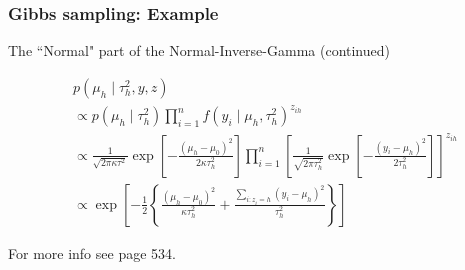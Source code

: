 \documentclass{beamer}
\begin{document}
\begin{frame}[fragile]
\frametitle{Gibbs sampling: Example}

The ``Normal" part of the Normal-Inverse-Gamma (continued)

\begin{align*}
&p(\mu_h \mid \tau^2_h, y, z) \\
&\propto p(\mu_h \mid \tau^2_{h})  \prod_{i=1}^n   f(y_i \mid \mu_h, \tau^2_h)^{z_{ih}}\\
&\propto \frac{1}{\sqrt{2\pi \kappa \tau^2  }}\exp\left[-\frac{(\mu_{h} -  \mu_0)^2 }{ 2\kappa \tau_h^2 } \right] \prod_{i=1}^n \left[ \frac{1}{\sqrt{2\pi \tau^2_{h} }}\exp\left[-\frac{(y_i - \mu_{h} )^2 }{ 2\tau^2_{h} } \right] \right]^{z_{ih}} \\
&\propto \exp\left[-\frac{1}{2}\left\{  \frac{(\mu_{h} -  \mu_0)^2 }{ \kappa \tau_h^2 }  + \frac{\sum_{i : z_i = h}(y_i - \mu_{h} )^2 }{ \tau^2_{h} } \right\}\right]
\end{align*}

For more info see page 534.


\end{frame}
\end{document}
